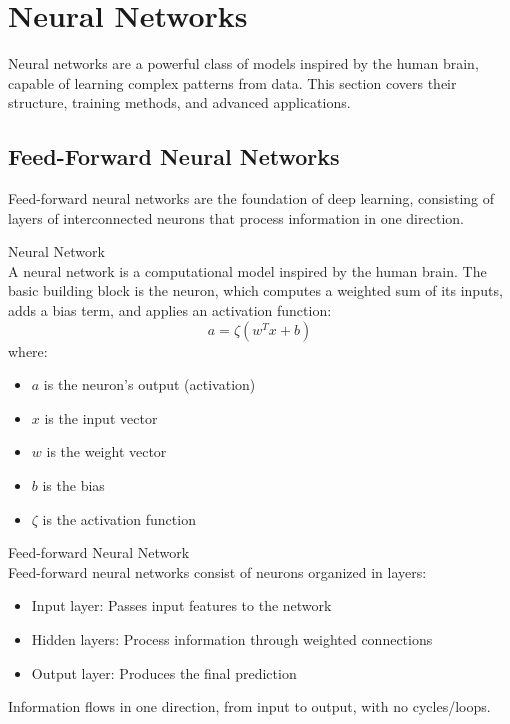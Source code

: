 \section{Neural Networks}

Neural networks are a powerful class of models inspired by the human brain, capable of learning complex patterns from data. This section covers their structure, training methods, and advanced applications.

\subsection{Feed-Forward Neural Networks}

Feed-forward neural networks are the foundation of deep learning, consisting of layers of interconnected neurons that process information in one direction.

\begin{definition}{Neural Network}\\
A neural network is a computational model inspired by the human brain. The basic building block is the neuron, which computes a weighted sum of its inputs, adds a bias term, and applies an activation function:
\[a = \zeta(w^T x + b)\]
where:
\begin{itemize}
    \item $a$ is the neuron's output (activation)
    \item $x$ is the input vector
    \item $w$ is the weight vector
    \item $b$ is the bias
    \item $\zeta$ is the activation function
\end{itemize}
\end{definition}

\begin{definition}{Feed-forward Neural Network}\\
Feed-forward neural networks consist of neurons organized in layers:
\begin{itemize}
    \item Input layer: Passes input features to the network
    \item Hidden layers: Process information through weighted connections
    \item Output layer: Produces the final prediction
\end{itemize}
Information flows in one direction, from input to output, with no cycles/loops.
\end{definition}

